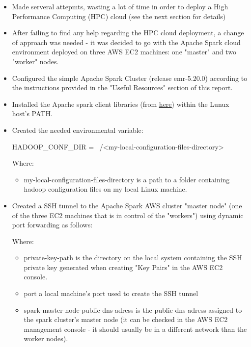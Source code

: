 \documentclass{customization}
\begin{document}
\begin{itemize}
    \item Made serveral attepmts, wasting a lot of time in order to deploy a High Performance Computing (HPC) cloud (see the next section for details)
    \item After failing to find any help regarding the HPC cloud deployment, a change of approach was needed - it was decided to go with the Apache Spark cloud environment deployed on three AWS EC2 machines: one "master" and two "worker" nodes.
    \item Configured the simple Apache Spark Cluster (release emr-5.20.0) according to the instructions provided in the "Useful Resources" section of this report.
    \item Installed the Apache spark client libraries (from \underline{\href{https://archive.apache.org/dist/spark/spark-2.2.0/}{here}}) within the Lunux host's PATH.
    \item Created the needed environmental variable:
    \begin{sexylisting}[colback=white]{}
HADOOP_CONF_DIR = 
    ~/<my-local-configuration-files-directory>
    \end{sexylisting}
    Where:
    \begin{itemize}
        \item my-local-configuration-files-directory is a path to a folder containing hadoop configuration files on my local Linux machine.
    \end{itemize}
    \item Created a SSH tunnel to the Apache Spark AWS cluster "master node" (one of the three EC2 machines that is in control of the "workers") using dynamic port forwarding as follows:
    Where:
    \begin{itemize}
        \item private-key-path is the directory on the local system containing the SSH private key generated when creating "Key Pairs" in the AWS EC2 console.
        \item port a local machine's port used to create the SSH tunnel
        \item spark-master-node-public-dns-adress is the public dns adress assigned to the spark cluster's master node (it can be checked in the AWS EC2 management console - it should usually be in a different network than the worker nodes).

\end{itemize}
\end{itemize}
\end{document}
